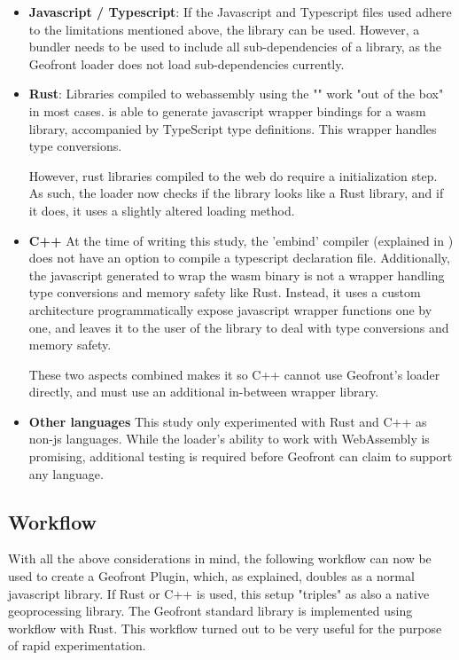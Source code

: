 \begin{itemize}[-]
  \item \textbf{Javascript / Typescript}: 
    If the Javascript and Typescript files used adhere to the limitations mentioned above, the library can be used. 
    However, a bundler needs to be used to include all sub-dependencies of a library, as the Geofront loader does not load sub-dependencies currently. 

  \item \textbf{Rust}:
    Libraries compiled to webassembly using the "" work "out of the box" in most cases.
     is able to generate javascript wrapper bindings for a \ac{wasm} library, accompanied by TypeScript type definitions. 
    This wrapper handles type conversions. 
    
    However, rust libraries compiled to the web do require a initialization step. 
    As such, the loader now checks if the library looks like a Rust library, and if it does, it uses a slightly altered loading method.
  \item \textbf{C++}
    At the time of writing this study, the 'embind' compiler (explained in ) does not have an option to compile a typescript declaration file. 
    Additionally, the javascript generated to wrap the wasm binary is not a wrapper handling type conversions and memory safety like Rust. 
    Instead, it uses a custom architecture programmatically expose javascript wrapper functions one by one, and leaves it to the user of the library to deal with type conversions and memory safety. 
    
    These two aspects combined makes it so C++ cannot use Geofront's loader directly, and must use an additional in-between wrapper library.

  \item \textbf{Other languages}
    This study only experimented with Rust and C++ as non-js languages.
    While the loader's ability to work with WebAssembly is promising, additional testing is required before Geofront can claim to support any language. 
\end{itemize}

\subsection{Workflow}

With all the above considerations in mind, the following workflow can now be used to create a Geofront Plugin, which, as explained, doubles as a normal javascript library. 
If Rust or C++ is used, this setup "triples" as also a native geoprocessing library.
The Geofront standard library is implemented using workflow with Rust.
This workflow turned out to be very useful for the purpose of rapid experimentation. 

